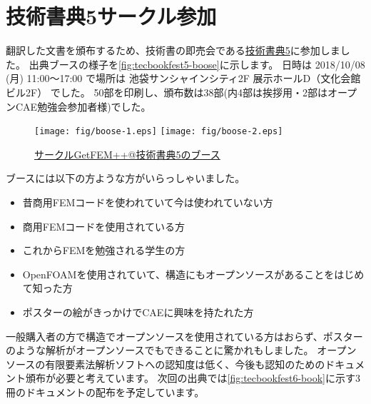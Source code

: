 \documentclass{../../style/ltjoc}
\begin{document}
\section{技術書典5サークル参加}
翻訳した文書を頒布するため、技術書の即売会である\href{https://techbookfest.org/event/tbf05}{技術書典5}に参加しました。
出典ブースの様子を\autoref{fig:tecbookfest5-boose}に示します。
日時は 2018/10/08 (月) 11:00〜17:00 で場所は 池袋サンシャインシティ2F 展示ホールD（文化会館ビル2F） でした。
50部を印刷し、頒布数は38部(内4部は挨拶用・2部はオープンCAE勉強会参加者様)でした。
%
\begin{figure}[htbp]
\centering
\texttt{[image: fig/boose-1.eps]}
\texttt{[image: fig/boose-2.eps]}
\caption{\href{https://techbookfest.org/event/tbf05}{サークルGetFEM++@技術書典5のブース}}
\label{fig:tecbookfest5-boose}
\end{figure}
ブースには以下の方ような方がいらっしゃいました。
\begin{itemize}
  \item{昔商用FEMコードを使われていて今は使われていない方}
  \item{商用FEMコードを使用されている方}
  \item{これからFEMを勉強される学生の方}
  \item{OpenFOAMを使用されていて、構造にもオープンソースがあることをはじめて知った方}
  \item{ポスターの絵がきっかけでCAEに興味を持たれた方}
\end{itemize}
一般購入者の方で構造でオープンソースを使用されている方はおらず、ポスターのような解析がオープンソースでもできることに驚かれもしました。
オープンソースの有限要素法解析ソフトへの認知度は低く、今後も認知のためのドキュメント頒布が必要と考えています。
次回の出典では\autoref{fig:tecbookfest6-book}に示す3冊のドキュメントの配布を予定しています。
%
\end{document}
